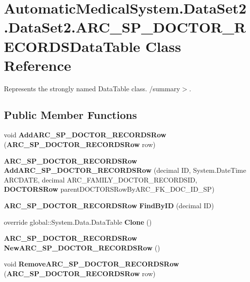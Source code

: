 \section{AutomaticMedicalSystem.DataSet2.DataSet2.ARC\_\-SP\_\-DOCTOR\_\-RECORDSDataTable Class Reference}
\label{class_automatic_medical_system_1_1_data_set2_1_1_a_r_c___s_p___d_o_c_t_o_r___r_e_c_o_r_d_s_data_table}
Represents the strongly named DataTable class. /summary$>$.  


\subsection*{Public Member Functions}
\begin{CompactItemize}
\item 
void \textbf{AddARC\_\-SP\_\-DOCTOR\_\-RECORDSRow} ({\bf ARC\_\-SP\_\-DOCTOR\_\-RECORDSRow} row)\label{class_automatic_medical_system_1_1_data_set2_1_1_a_r_c___s_p___d_o_c_t_o_r___r_e_c_o_r_d_s_data_table_0fd43d11c3dfcd6671624af4f594d7e8}

\item 
{\bf ARC\_\-SP\_\-DOCTOR\_\-RECORDSRow} \textbf{AddARC\_\-SP\_\-DOCTOR\_\-RECORDSRow} (decimal ID, System.DateTime ARCDATE, decimal ARC\_\-FAMILY\_\-DOCTOR\_\-RECORDSID, {\bf DOCTORSRow} parentDOCTORSRowByARC\_\-FK\_\-DOC\_\-ID\_\-SP)\label{class_automatic_medical_system_1_1_data_set2_1_1_a_r_c___s_p___d_o_c_t_o_r___r_e_c_o_r_d_s_data_table_98ed23e6813cedd676a866cbbf8e7f20}

\item 
{\bf ARC\_\-SP\_\-DOCTOR\_\-RECORDSRow} \textbf{FindByID} (decimal ID)\label{class_automatic_medical_system_1_1_data_set2_1_1_a_r_c___s_p___d_o_c_t_o_r___r_e_c_o_r_d_s_data_table_4913f39e6656f1ba5c159c3549b3f1e2}

\item 
override global::System.Data.DataTable \textbf{Clone} ()\label{class_automatic_medical_system_1_1_data_set2_1_1_a_r_c___s_p___d_o_c_t_o_r___r_e_c_o_r_d_s_data_table_e5211a997c835d5754157b8d514c3e14}

\item 
{\bf ARC\_\-SP\_\-DOCTOR\_\-RECORDSRow} \textbf{NewARC\_\-SP\_\-DOCTOR\_\-RECORDSRow} ()\label{class_automatic_medical_system_1_1_data_set2_1_1_a_r_c___s_p___d_o_c_t_o_r___r_e_c_o_r_d_s_data_table_b1d6f9094c89f653a1db770f3a66fa2c}

\item 
void \textbf{RemoveARC\_\-SP\_\-DOCTOR\_\-RECORDSRow} ({\bf ARC\_\-SP\_\-DOCTOR\_\-RECORDSRow} row)\label{class_automatic_medical_system_1_1_data_set2_1_1_a_r_c___s_p___d_o_c_t_o_r___r_e_c_o_r_d_s_data_table_695452ed03c3a6d3f8eff757bcd51f27}

\end{CompactItemize}
